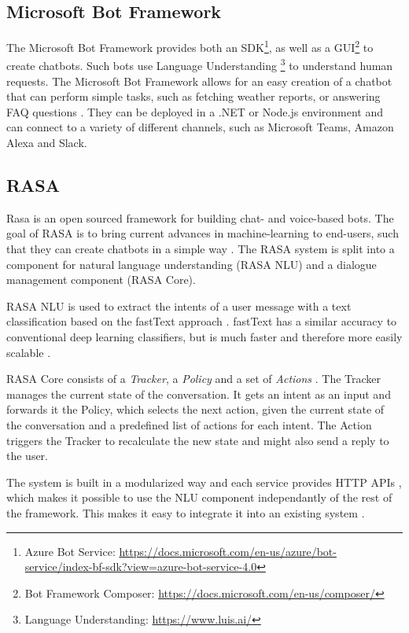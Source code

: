 \subsection{Microsoft Bot Framework}
The Microsoft Bot Framework provides both an SDK\footnote{Azure Bot Service: \href{https://docs.microsoft.com/en-us/azure/bot-service/index-bf-sdk?view=azure-bot-service-4.0}{https://docs.microsoft.com/en-us/azure/bot-service/index-bf-sdk?view=azure-bot-service-4.0}}, as well as a GUI\footnote{Bot Framework Composer: \href{https://docs.microsoft.com/en-us/composer/}{https://docs.microsoft.com/en-us/composer/}} to create chatbots. Such bots use Language Understanding \footnote{Language Understanding: \href{https://www.luis.ai/}{https://www.luis.ai/}} to understand human requests. The Microsoft Bot Framework allows for an easy creation of a chatbot that can perform simple tasks, such as fetching weather reports, or answering FAQ questions \cite{CaWh14}. They can be deployed in a .NET or Node.js environment and can connect to a variety of different channels, such as Microsoft Teams, Amazon Alexa and Slack.

\subsection{RASA}
Rasa is an open sourced framework for building chat- and voice-based bots. The goal of RASA is to bring current advances in machine-learning to end-users, such that they can create chatbots in a simple way \cite{BFPN17}. The RASA system is split into a component for natural language understanding (RASA NLU) and a dialogue management component (RASA Core).

RASA NLU is used to extract the intents of a user message with a text classification based on the fastText approach \cite{BFPN17}. fastText has a similar accuracy to conventional deep learning classifiers, but is much faster and therefore more easily scalable \cite{JGBM16}.

RASA Core consists of a \emph{Tracker}, a \emph{Policy} and a set of \emph{Actions} \cite{BFPN17}. The Tracker manages the current state of the conversation. It gets an intent as an input and forwards it the Policy, which selects the next action, given the current state of the conversation and a predefined list of actions for each intent. The Action triggers the Tracker to recalculate the new state and might also send a reply to the user.

The system is built in a modularized way and each service provides HTTP APIs \cite{BFPN17}, which makes it possible to use the NLU component independantly of the rest of the framework. This makes it easy to integrate it into an existing system \cite{RaKe19}.

